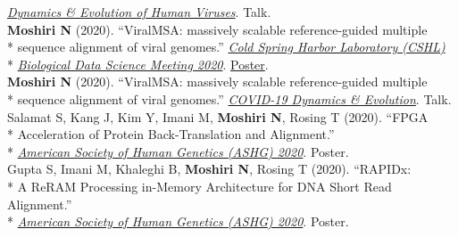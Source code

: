 \documentclass[margin,line]{res}
\begin{document}
\begin{resume}
\hspace*{8mm} \href{https://cpd.ucsd.edu/hivdynamics/}{\textit{Dynamics \& Evolution of Human Viruses}}. Talk.\\
\hspace*{4mm} \textbf{Moshiri N} (2020). ``ViralMSA: massively scalable reference-guided multiple\\*
\hspace*{9mm} sequence alignment of viral genomes.'' \href{http://meetings.cshl.edu/meetings.aspx?meet=DATA&year=20}{\textit{Cold Spring Harbor Laboratory (CSHL)}}\\*\vspace{2mm}
\hspace*{8mm} \href{http://meetings.cshl.edu/meetings.aspx?meet=DATA&year=18}{\textit{Biological Data Science Meeting 2020}}. \href{https://meetings.cshl.edu/posters/data20/data2020_AbstractBookVirtual.pdf}{Poster}.\\
\hspace*{4mm} \textbf{Moshiri N} (2020). ``ViralMSA: massively scalable reference-guided multiple\\*\vspace{2mm}
\hspace*{8mm} sequence alignment of viral genomes.'' \href{https://cpd.ucsd.edu/covid19/}{\textit{COVID-19 Dynamics \& Evolution}}. Talk.\\
\hspace*{4mm} Salamat S, Kang J, Kim Y, Imani M, \textbf{Moshiri N}, Rosing T (2020). ``FPGA\\*
\hspace*{9mm} Acceleration of Protein Back-Translation and Alignment.''\\*\vspace{2mm}
\hspace*{7mm} \href{https://www.ashg.org/meetings/2020meeting}{\textit{American Society of Human Genetics (ASHG) 2020}}. Poster.\\
\hspace*{4mm} Gupta S, Imani M, Khaleghi B, \textbf{Moshiri N}, Rosing T (2020). ``RAPIDx:\\*
\hspace*{9mm} A ReRAM Processing in-Memory Architecture for DNA Short Read Alignment.''\\*\vspace{2mm}
\hspace*{7mm} \href{https://www.ashg.org/meetings/2020meeting}{\textit{American Society of Human Genetics (ASHG) 2020}}. Poster.\\

\end{resume}
\end{document}

